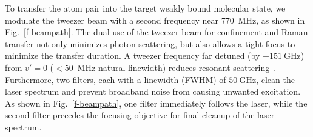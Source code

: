 \documentclass[aps,prl,twocolumn,10pt,superscriptaddress]{revtex4-1}
\newcommand{\Na}{\mathrm{Na}}
\newcommand{\Cs}{\mathrm{Cs}}
\newcounter{TRC}
\newcommand{\TR}[1]{\textcolor{violet}{[[\stepcounter{TRC} TR\arabic{TRC}: #1]]}}
\begin{document}
To transfer the atom pair into the target weakly bound molecular state,
we modulate the tweezer beam with a second frequency near $770$~MHz, as shown in Fig.~\ref{f-beampath}.
The dual use of the tweezer beam for confinement and Raman transfer not only minimizes photon scattering,
but also allows a tight focus to minimize the transfer duration. A tweezer frequency far detuned (by $-151~\mathrm{GHz}$) from $v' = 0 $ ($<50$~MHz natural linewidth) reduces resonant scattering~\cite{Liu2019}.
Furthermore, two filters, each with a linewidth (FWHM) of $50~\mathrm{GHz}$,
clean the laser spectrum and prevent broadband noise from causing unwanted excitation.
As shown in Fig.~\ref{f-beampath}, one filter immediately follows the laser, while the second filter precedes the focusing objective for final cleanup of the laser spectrum.


\end{document}
